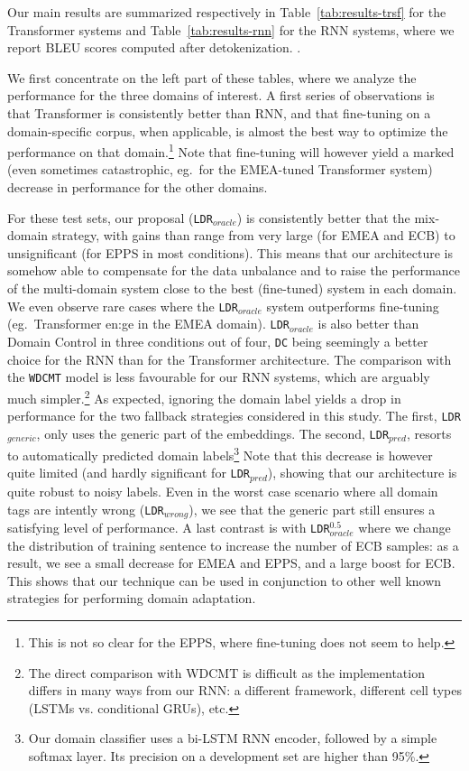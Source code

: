 \documentclass[11pt,a4paper]{article}
\newcommand{\fyTodo}[1]{\Todo[FY:]{\textcolor{orange}{#1}}}
\newcommand{\fyDone}[1]{\done[FY]\Todo[FY:]{\textcolor{orange}{#1}}}
\begin{document}
Our main results are summarized respectively in Table~\ref{tab:results-trsf} for the Transformer systems and Table~\ref{tab:results-rnn} for the RNN systems, where we report BLEU scores \cite{Papineni02bleu} computed after detokenization. \fyTodo{Footnote for missing numbers}.

We first concentrate on the left part of these tables, where we analyze the performance for the three domains of interest. A first series of observations is that Transformer is consistently better than RNN, and that fine-tuning on a domain-specific corpus, when applicable, is almost the best way to optimize the performance on that domain.\footnote{This is not so clear for the EPPS, where fine-tuning does not seem to help.}  Note that fine-tuning will however yield a marked (even sometimes catastrophic, eg.\ for the EMEA-tuned Transformer system) decrease in performance for the other domains. 

For these test sets, our proposal (\texttt{LDR}$_{oracle}$) is consistently better that the mix-domain strategy, with gains than range from very large (for EMEA and ECB) to unsignificant (for EPPS in most conditions). This means that our architecture is somehow able to compensate for the data unbalance and to raise the performance of the multi-domain system close to the best (fine-tuned) system in each domain. We even observe rare cases where the \texttt{LDR}$_{oracle}$ system outperforms fine-tuning (eg.\ Transformer en:ge in the EMEA domain). \texttt{LDR}$_{oracle}$ is also better than Domain Control in three conditions out of four, \texttt{DC} being seemingly a better choice for the RNN than for the Transformer architecture. The comparison with the \texttt{WDCMT} model is less favourable for our RNN systems, which are arguably much simpler.\footnote{The direct comparison with WDCMT is difficult as the implementation differs in many ways from our RNN: a different framework, different cell types (LSTMs vs. conditional GRUs), etc.} \fyDone{More on this.}
As expected, ignoring the domain label yields a drop in performance for the two fallback strategies considered in this study. The first, \texttt{LDR}$_{generic}$, only uses the generic part of the embeddings. The second, \texttt{LDR}$_{pred}$, resorts to automatically predicted domain labels\footnote{Our domain classifier uses a bi-LSTM RNN encoder, followed by a simple softmax layer. Its precision on a development set are higher than 95\%.}
\fyTodo{Explain how} Note that this decrease is however quite limited (and hardly significant for \texttt{LDR}$_{pred}$), showing that our architecture is quite robust to noisy labels. Even in the worst case scenario where all domain tags are intently wrong (\texttt{LDR}$_{wrong}$), we see that the generic part still ensures a satisfying level of performance. A last contrast is with \texttt{LDR}$_{oracle}^{0.5}$ where we change the distribution of training sentence to increase the number of ECB samples: as a result, we see a small decrease for EMEA and EPPS, and a large boost for ECB. This shows that our technique can be used in conjunction to other well known strategies for performing domain adaptation. 
\end{document}

